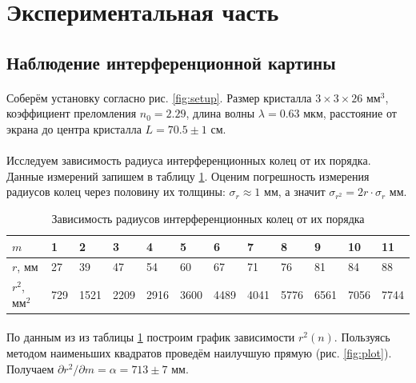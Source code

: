 \documentclass[a4paper,12pt]{article} %
\begin{document}
\section{Экспериментальная часть}


\subsection{Наблюдение интерференционной картины}

\paragraph{} Соберём установку согласно рис. \ref{fig:setup}. Размер кристалла $3\times3\times26$ мм$^3$, коэффициент преломления $n_0=2.29$, длина волны $\lambda = 0.63$ мкм, расстояние от экрана до центра кристалла $L = 70.5 \pm 1$ см.

\paragraph{} Исследуем зависимость радиуса интерференционных колец от их порядка. Данные измерений запишем в таблицу \ref{tab:radius}. Оценим погрешность измерения радиусов колец через половину их толщины: $\sigma_r \approx 1$ мм, а значит $\sigma_{r^2} = 2r \cdot \sigma_r$ мм.

\begin{table}[h]
\centering
\begin{tabular}{|l|l|l|l|l|l|l|l|l|l|l|l|}
\hline
$m$           & 1   & 2    & 3    & 4    & 5    & 6    & 7    & 8    & 9    & 10   & 11   \\ \hline
$r$, мм       & 27  & 39   & 47   & 54   & 60   & 67   & 71   & 76   & 81   & 84   & 88   \\ \hline
$r^2$, мм$^2$ & 729 & 1521 & 2209 & 2916 & 3600 & 4489 & 4041 & 5776 & 6561 & 7056 & 7744 \\ \hline
\end{tabular}
\caption{Зависимость радиусов интерференционных колец от их порядка}
\label{tab:radius}
\end{table}

\paragraph{} По данным из из таблицы \ref{tab:radius} построим график зависимости $r^2(n)$. Пользуясь методом наименьших квадратов проведём наилучшую прямую (рис. \ref{fig:plot}). Получаем $\partial r^2 / \partial m = \alpha = 713 \pm 7$ мм.
\end{document}
